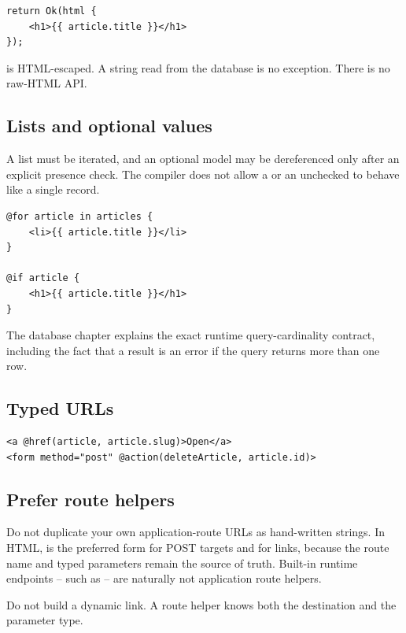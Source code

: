 \begin{lstlisting}[language=Velran]
return Ok(html {
    <h1>{{ article.title }}</h1>
});
\end{lstlisting}

 is HTML-escaped. A string read from the database is no exception. There is no raw-HTML API.

\subsection*{Lists and optional values}

A list must be iterated, and an optional model may be dereferenced only after an explicit presence check. The compiler does not allow a  or an unchecked  to behave like a single record.

\begin{lstlisting}[language=Velran]
@for article in articles {
    <li>{{ article.title }}</li>
}

@if article {
    <h1>{{ article.title }}</h1>
}
\end{lstlisting}

The database chapter explains the exact runtime query-cardinality contract, including the fact that a  result is an error if the query returns more than one row.

\subsection*{Typed URLs}

\begin{lstlisting}[language=Velran]
<a @href(article, article.slug)>Open</a>
<form method="post" @action(deleteArticle, article.id)>
\end{lstlisting}

\subsection*{Prefer route helpers}

Do not duplicate your own application-route URLs as hand-written strings. In HTML,  is the preferred form for POST targets and  for links, because the route name and typed parameters remain the source of truth. Built-in runtime endpoints -- such as  -- are naturally not application route helpers.

Do not build a dynamic  link. A route helper knows both the destination and the parameter type.

